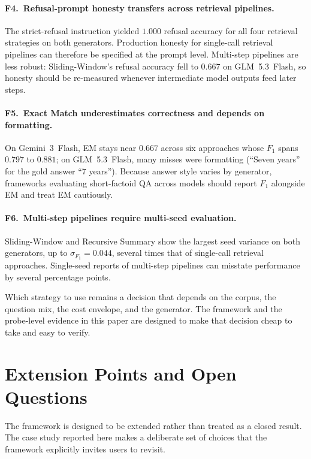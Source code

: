 \documentclass[conference,a4paper,10pt]{IEEEtran}
\begin{document}
\paragraph{F4.~Refusal-prompt honesty transfers across retrieval pipelines.}
The strict-refusal instruction yielded $1.000$ refusal accuracy for all four retrieval strategies on both generators.
Production honesty for single-call retrieval pipelines can therefore be specified at the prompt level.
Multi-step pipelines are less robust: Sliding-Window's refusal accuracy fell to $0.667$ on GLM~5.3~Flash, so honesty should be re-measured whenever intermediate model outputs feed later steps.

\paragraph{F5.~Exact Match underestimates correctness and depends on formatting.}
On Gemini~3~Flash, EM stays near $0.667$ across six approaches whose $F_1$ spans $0.797$ to $0.881$; on GLM~5.3~Flash, many misses were formatting (``Seven years'' for the gold answer ``7 years'').
Because answer style varies by generator, frameworks evaluating short-factoid QA across models should report $F_1$ alongside EM and treat EM cautiously.

\paragraph{F6.~Multi-step pipelines require multi-seed evaluation.}
Sliding-Window and Recursive Summary show the largest seed variance on both generators, up to $\sigma_{F_1} = 0.044$, several times that of single-call retrieval approaches.
Single-seed reports of multi-step pipelines can misstate performance by several percentage points.

Which strategy to use remains a decision that depends on the corpus, the question mix, the cost envelope, and the generator.
The framework and the probe-level evidence in this paper are designed to make that decision cheap to take and easy to verify.

\section{Extension Points and Open Questions}
\label{sec:limits}

The framework is designed to be extended rather than treated as a closed result.
The case study reported here makes a deliberate set of choices that the framework explicitly invites users to revisit.
\end{document}
